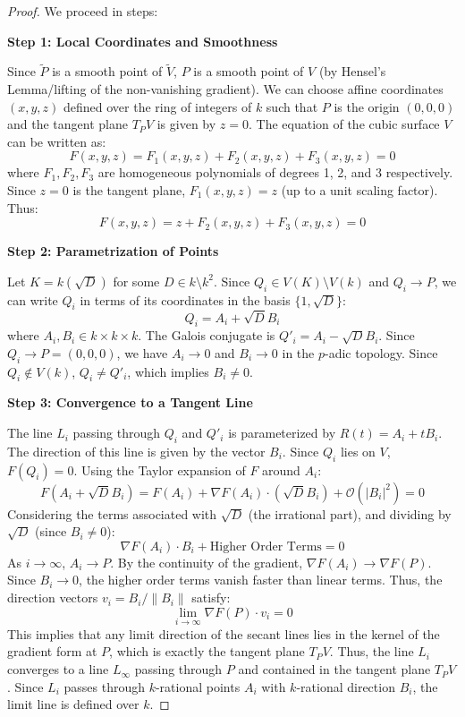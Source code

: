\documentclass[11pt]{article}
\theoremstyle{definition}
\begin{document}
\begin{proof}
We proceed in steps:

\vspace{0.5em}
\noindent\textbf{Step 1: Local Coordinates and Smoothness}

    Since $\tilde{P}$ is a smooth point of $\tilde{V}$, $P$ is a smooth point of $V$ (by Hensel's Lemma/lifting of the non-vanishing gradient). We can choose affine coordinates $(x,y,z)$ defined over the ring of integers of $k$ such that $P$ is the origin $(0,0,0)$ and the tangent plane $T_P V$ is given by $z=0$.
    The equation of the cubic surface $V$ can be written as:
    \[ F(x,y,z) = F_1(x,y,z) + F_2(x,y,z) + F_3(x,y,z) = 0 \]
    where $F_1, F_2, F_3$ are homogeneous polynomials of degrees 1, 2, and 3 respectively. Since $z=0$ is the tangent plane, $F_1(x,y,z) = z$ (up to a unit scaling factor). Thus:
    \[ F(x,y,z) = z + F_2(x,y,z) + F_3(x,y,z) = 0 \]

\vspace{0.5em}
\noindent\textbf{Step 2: Parametrization of Points}

    Let $K = k(\sqrt{D})$ for some $D \in k \setminus k^2$. Since $Q_i \in V(K) \setminus V(k)$ and $Q_i \to P$, we can write $Q_i$ in terms of its coordinates in the basis $\{1, \sqrt{D}\}$:
    \[ Q_i = A_i + \sqrt{D} B_i \]
    where $A_i, B_i \in k \times k \times k$. The Galois conjugate is $Q'_i = A_i - \sqrt{D} B_i$.
    Since $Q_i \to P=(0,0,0)$, we have $A_i \to 0$ and $B_i \to 0$ in the $p$-adic topology.
    Since $Q_i \notin V(k)$, $Q_i \neq Q'_i$, which implies $B_i \neq 0$.

\vspace{0.5em}
\noindent\textbf{Step 3: Convergence to a Tangent Line}

    The line $L_i$ passing through $Q_i$ and $Q'_i$ is parameterized by $R(t) = A_i + t B_i$. The direction of this line is given by the vector $B_i$.
    Since $Q_i$ lies on $V$, $F(Q_i) = 0$. Using the Taylor expansion of $F$ around $A_i$:
    \[ F(A_i + \sqrt{D} B_i) = F(A_i) + \nabla F(A_i) \cdot (\sqrt{D} B_i) + \mathcal{O}(|B_i|^2) = 0 \]
    Considering the terms associated with $\sqrt{D}$ (the irrational part), and dividing by $\sqrt{D}$ (since $B_i \neq 0$):
    \[ \nabla F(A_i) \cdot B_i + \text{Higher Order Terms} = 0 \]
    As $i \to \infty$, $A_i \to P$. By the continuity of the gradient, $\nabla F(A_i) \to \nabla F(P)$. Since $B_i \to 0$, the higher order terms vanish faster than linear terms. Thus, the direction vectors $v_i = B_i / \|B_i\|$ satisfy:
    \[ \lim_{i \to \infty} \nabla F(P) \cdot v_i = 0 \]
    This implies that any limit direction of the secant lines lies in the kernel of the gradient form at $P$, which is exactly the tangent plane $T_P V$.
    Thus, the line $L_i$ converges to a line $L_\infty$ passing through $P$ and contained in the tangent plane $T_P V$. Since $L_i$ passes through $k$-rational points $A_i$ with $k$-rational direction $B_i$, the limit line is defined over $k$.


\end{proof}
\end{document}
